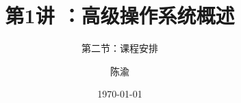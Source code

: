 


\title[第1讲]{第1讲 ：高级操作系统概述} %
\subtitle{第二节：课程安排}
\author{陈渝} %
\date{\today} %




\begin{frame}
\titlepage %
\end{frame}

